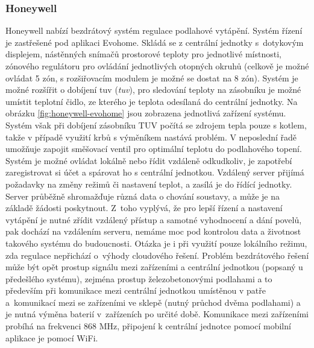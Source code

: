 \subsubsection{Honeywell}
Honeywell nabízí bezdrátový systém regulace podlahové vytápění. Systém řízení je zastřešené pod aplikaci Evohome. Skládá se z centrální jednotky s~dotykovým displejem, nástěnných snímačů prostorové teploty pro jednotlivé místnosti, zónového regulátoru pro ovládání jednotlivých otopných okruhů (celkově je možné ovládat 5 zón, s rozšiřovacím modulem je možné se dostat na 8 zón). Systém je možné rozšířit o dobíjení \acrshort{tuv} (\textit{\acrlong{tuv}}), pro sledování teploty na zásobníku je možné umístit teplotní čidlo, ze kterého je teplota odesílaná do centrální jednotky. Na obrázku \ref{fig:honeywell-evohome} jsou zobrazena jednotlivá zařízení systému. Systém však při dobíjení zásobníku TUV počítá se zdrojem tepla pouze s kotlem, takže v případě využití krbů s výměníkem nastává problém. V neposlední řadě umožňuje zapojit směšovací ventil pro optimální teplotu do podlahového topení. Systém je možné ovládat lokálně nebo řídit vzdáleně odkudkoliv, je zapotřebí zaregistrovat si účet a spárovat ho s  centrální jednotkou. Vzdálený server přijímá požadavky na změny režimů či nastavení teplot, a zasílá je do řídící jednotky. Server průběžně shromažďuje různá data o chování soustavy, a může je na základě žádosti poskytnout. Z~toho vyplývá, že pro lepší řízení a nastavení vytápění je nutné zřídit vzdálený přístup a samotné vyhodnocení a dání povelů, pak dochází na vzdálením serveru, nemáme moc pod kontrolou data a životnost takového systému do budoucnosti. Otázka je i při využití pouze lokálního režimu, zda regulace nepřichází o~výhody cloudového řešení. Problém bezdrátového řešení může být opět prostup signálu mezi zařízeními a centrální jednotkou (popsaný u předešlého systému), zejména prostup železobetonovými podlahami a to především při komunikace mezi centrální jednotkou umístěnou v patře a~komunikací mezi se zařízeními ve sklepě (nutný průchod dvěma podlahami) a je nutná výměna baterií v~zařízeních po určité době. Komunikace mezi zařízeními probíhá na frekvenci 868 MHz, připojení k centrální jednotce pomocí mobilní aplikace je pomocí WiFi.

\newpage

